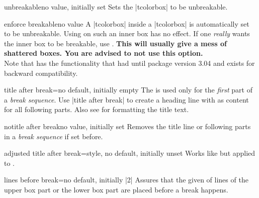 \begin{docTcbKey}{unbreakable}{}{no value, initially set}
  Sets the |tcolorbox| to be unbreakable.
\end{docTcbKey}


\begin{docTcbKey}{enforce breakable}{}{no value}
  A |tcolorbox| inside a |tcolorbox| is automatically set to be unbreakable.
  Using  on such an inner box has no effect.
  If one \emph{really} wants the inner box to be breakable, use .
  \textbf{This will usually give a mess of shattered boxes. You are advised to not use this option.}\\
  Note that  has the functionality
  that  had until package version 3.04
  and exists for backward compatibility.
\end{docTcbKey}


\begin{docTcbKey}[][doc updated=2018-07-26]{title after break}{=}{no default, initially empty}
  The  is used only for the \emph{first} part of a
  \emph{break sequence}. Use |title after break| to create a heading line
  with  as content for all following parts.
  Also see  for formatting the title text.
\end{docTcbKey}


\begin{docTcbKey}{notitle after break}{}{no value, initially set}
  Removes the title line or following parts in a  \emph{break sequence} if set before.
\end{docTcbKey}


\begin{docTcbKey}{adjusted title after break}{=}{style, no default, initially unset}
  Works like  but applied to .
\end{docTcbKey}


\begin{docTcbKey}{lines before break}{=}{no default, initially |2|}
  Assures that the given  of lines of the upper box part or
  the lower box part are placed before a break happens.
\end{docTcbKey}

